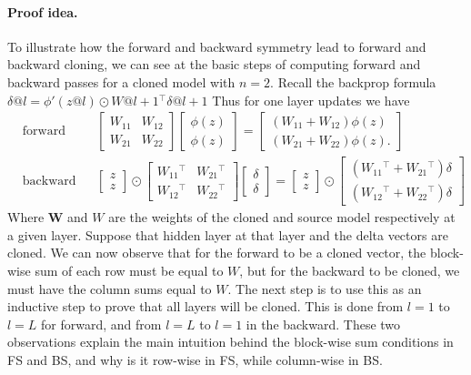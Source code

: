 \documentclass{article}
\newcommand{\1}{\mathbf{1}}
\newcommand{\B}[1]{\boldsymbol{#1}}
\newcommand{\T}{\ensuremath{{}^{\top}}}
\begin{document}
\paragraph{Proof idea.} To illustrate how the forward and backward symmetry lead to forward and backward cloning, we can see at the basic steps of computing forward and backward passes for a cloned model with $n=2.$  Recall the backprop formula $\delta@ l =\phi'(z@l)\odot  W@{l+1}\T \delta@{l+1} $
Thus for one layer updates we have 
\begin{align*}
   &\text{forward} &&\begin{bmatrix}
        W_{11} & W_{12} \\
        W_{21} & W_{22} 
    \end{bmatrix} \begin{bmatrix}
        \phi(z) \\ \phi(z) 
    \end{bmatrix} = \begin{bmatrix}
        (W_{11}+W_{12}) \phi(z) \\
        (W_{21}+W_{22})\phi(z). 
    \end{bmatrix} \\
   &\text{backward} &&\begin{bmatrix}
       z \\ z
   \end{bmatrix}\odot \begin{bmatrix}
        W_{11}\T & W_{21}\T \\
        W_{12}\T & W_{22}\T 
    \end{bmatrix}\begin{bmatrix}
        \delta \\ \delta 
    \end{bmatrix} = \begin{bmatrix}
       z \\ z
   \end{bmatrix}\odot 
    \begin{bmatrix}
        (W_{11}\T + W_{21}\T )\delta \\
        (W_{12}\T + W_{22}\T )\delta 
    \end{bmatrix} 
\end{align*}
Where $\B W$ and $W$ are the weights of the cloned and source model respectively at a given layer. Suppose that hidden layer at that layer and the delta vectors are cloned. We can now observe that for the forward to be a cloned vector, the block-wise sum of each row must be equal to $W$, but for the backward to be cloned, we must have the column sums equal to $W.$ The next step is to use this as an inductive step to prove that all layers will be cloned. This is done from $l=1$ to $l=L$ for forward, and from $l=L$ to $l=1$ in the backward.  These two observations explain the main intuition behind the block-wise sum conditions in FS and BS, and why is it row-wise in FS, while column-wise in BS. 
\end{document}
